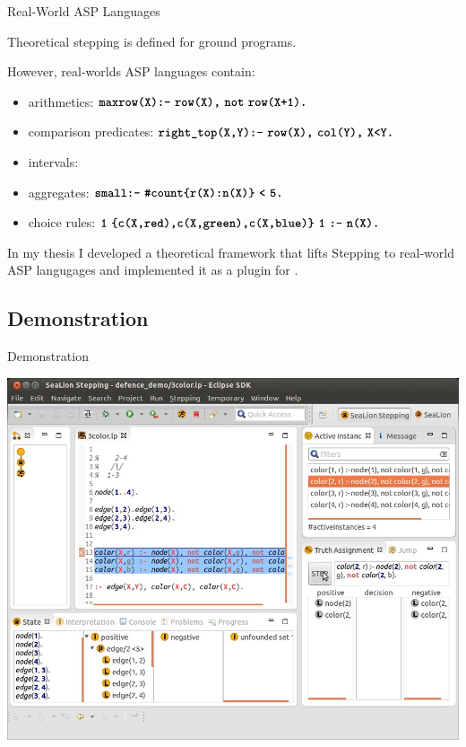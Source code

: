 \documentclass[trans,draft]{beamer} %
\begin{document}
\begin{frame}{Real-World ASP Languages}
	\onslide<+->
	
	Theoretical stepping is defined for ground programs.
	
	\onslide<+->
	
	However, real-worlds ASP languages contain:
	
	\begin{itemize}
		\item arithmetics: $\code{maxrow(X):-}\ \code{row(X),}\ \code{not}\ \code{row(X+1).}$
		\onslide<+->
		\item comparison predicates: $\code{right\_top(X,Y):-}\ \code{row(X),}\ \code{col(Y),}\ \code{X<Y.}$
		\onslide<+->
		\item intervals: 
		\onslide<+->
		\item aggregates: $\code{small:-}\ \code{\#count\{r(X):n(X)\}}\ \code{<}\ \code{5.}$
		\onslide<+->
		\item choice rules: $\code{1}\ \code{\{c(X,red),c(X,green),c(X,blue)\}}\ \code{1}\ \code{:-}\ \code{n(X).}$
	\end{itemize}
	
	\onslide<+->
	
	In my thesis I developed a theoretical framework that lifts Stepping to real-world ASP langugages
	and implemented it as a plugin for \sealion.
	
\end{frame}


\subsection{Demonstration}

\begin{frame}{Demonstration}
	
	\includegraphics[width=\textwidth]{stepping_perspective}
	
\end{frame}
\end{document}
